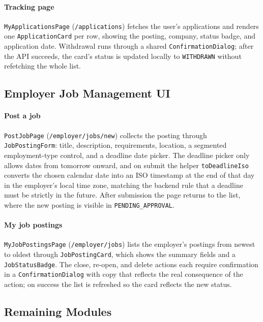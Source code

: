 \paragraph{Tracking page}
\texttt{MyApplicationsPage} (\texttt{/applications}) fetches the user's applications and renders one \texttt{ApplicationCard} per row, showing the posting, company, status badge, and application date. Withdrawal runs through a shared \texttt{ConfirmationDialog}; after the API succeeds, the card's status is updated locally to \texttt{WITHDRAWN} without refetching the whole list.

\subsection{Employer Job Management UI}

\paragraph{Post a job}
\texttt{PostJobPage} (\texttt{/employer/jobs/new}) collects the posting through\\ \texttt{JobPostingForm}: title, description, requirements, location, a segmented employment-type control, and a deadline date picker. The deadline picker only allows dates from tomorrow onward, and on submit the helper \texttt{toDeadlineIso} converts the chosen calendar date into an ISO timestamp at the end of that day in the employer's local time zone, matching the backend rule that a deadline must be strictly in the future. After submission the page returns to the list, where the new posting is visible in \texttt{PENDING\_APPROVAL}.

\paragraph{My job postings}
\texttt{MyJobPostingsPage} (\texttt{/employer/jobs}) lists the employer's postings from newest to oldest through \texttt{JobPostingCard}, which shows the summary fields and a \texttt{JobStatusBadge}. The close, re-open, and delete actions each require confirmation in a \texttt{ConfirmationDialog} with copy that reflects the real consequence of the action; on success the list is refreshed so the card reflects the new status.

\subsection{Remaining Modules}

